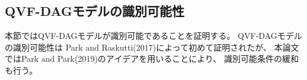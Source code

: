 
\subsection{QVF-DAGモデルの識別可能性}

本節ではQVF-DAGモデルが識別可能であることを証明する。
QVF-DAGモデルの識別可能性は
Park and Raskutti(2017)\cite{Park2017-hw}によって初めて証明されたが、
本論文ではPark and Park(2019)\cite{Park2019-qy}のアイデアを用いることにより、
識別可能条件の緩和も行う。

